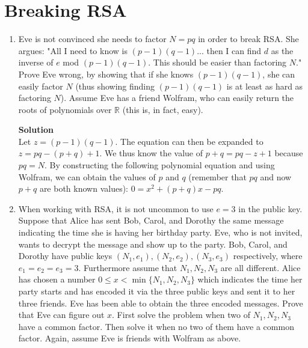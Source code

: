 \documentclass[11pt]{article}
\newcommand*{\Question}[1]{\section{#1}}
\newenvironment{Parts}{\begin{enumerate}[label=(\alph*)]}{\end{enumerate}}
\newcommand*{\Part}{\item}
\newenvironment{Answer}{\vspace{10pt}\begin{mdframed}\textbf{Solution}\\}{\end{mdframed}\vfill\pagebreak[3]}
\newenvironment{Answer}{\vspace{10pt}}{\vfill\pagebreak[3]}
\newcommand*{\R}{\mathbb{R}}
\begin{document}
\Question{Breaking RSA}
\begin{Parts}
    \Part Eve is not convinced she needs to factor $N = pq$ in order to break
        RSA.
        She argues: "All I need to know is $(p-1)(q-1)$... then I can find $d$
    as the inverse of $e$ mod $(p-1)(q-1)$. This should be easier than
    factoring $N$."
    Prove Eve wrong, by showing that if she knows $(p-1)(q-1)$,
  she can easily factor $N$ (thus showing finding $(p-1)(q-1)$ is at least
  as hard as factoring $N$). Assume Eve has a friend Wolfram, who can easily return the
    roots of polynomials over $\R$ (this is, in fact, easy).
  \begin{Answer}
    Let $z=(p-1)(q-1)$. The equation can then be expanded to $z=pq-(p+q)+1$. We thus know the value of $p+q=pq-z+1$ because $pq=N$. By constructing the following polynomial equation and using Wolfram, we can obtain the values of $p$ and $q$ (remember that $pq$ and now $p+q$ are both known values): $0=x^2+(p+q)x-pq$.
  \end{Answer}

  \Part When working with RSA, it is not uncommon to use $e=3$ in the public
        key. Suppose that Alice has sent Bob, Carol, and Dorothy the same
        message indicating the time she is having her birthday party. Eve, who is
        not invited, wants to decrypt the message and show up to the
        party.
        Bob, Carol, and Dorothy have public keys $(N_1, e_1), (N_2, e_2), (N_3,
        e_3)$ respectively, where $e_1=e_2=e_3=3$. Furthermore assume that $N_1,N_2,N_3$ are
        all different. Alice has chosen a number $0\leq x< \min\{N_1,N_2,N_3\}$ which
        indicates the time her party starts and has encoded it via the three
        public keys and sent it to her three friends. Eve has been able to
        obtain the three encoded messages. Prove that Eve can figure out $x$.
        First solve the problem when two of $N_1,N_2,N_3$ have a
        common factor. Then solve it when no two of them have a common factor.
        Again, assume Eve is friends with Wolfram as above.
        

\end{Parts}
\end{document}
